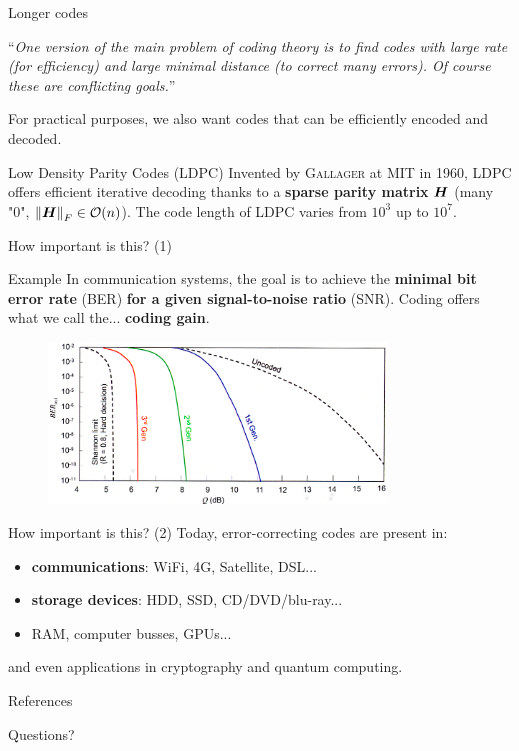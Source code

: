\documentclass[10pt]{beamer}
\begin{document}
\begin{frame}{Longer codes}
    \begin{center}
        ``\textit{One version of the main problem of coding theory is to find codes
        with large rate (for efficiency) and large minimal distance (to correct
        many errors). Of course these are conflicting goals.}''
        \cite{macwilliams}
    \end{center}

    For practical purposes, we also want codes that can be efficiently encoded and decoded.

    \begin{exampleblock}{Low Density Parity Codes (LDPC)}
        Invented by \textsc{Gallager} at MIT in 1960, LDPC offers efficient iterative decoding
        thanks to a \textbf{sparse parity matrix} $\boldsymbol{H}$
        (many "0", $\left\lVert\boldsymbol{H}\right\rVert_F \in \mathcal{O}(n)$).
        The code length of LDPC varies from $10^3$ up to $10^7$.
    \end{exampleblock}
\end{frame}

\begin{frame}{How important is this? (1)}
    \begin{exampleblock}{Example}
        In communication systems, the goal is to achieve the \textbf{minimal bit error rate}
        (BER) \textbf{for a given signal-to-noise ratio} (SNR). Coding offers what we call the...
        \textbf{coding gain}.
        \begin{figure}[ht]
            \centering
            \includegraphics[width=0.8\textwidth]{img/example-com.png}
        \end{figure}
    \end{exampleblock}
\end{frame}

\begin{frame}{How important is this? (2)}
    Today, error-correcting codes are present in:
    \begin{itemize}
        \item \textbf{communications}: WiFi, 4G, Satellite, DSL...
        \item \textbf{storage devices}: HDD, SSD, CD/DVD/blu-ray...
        \item RAM, computer busses, GPUs...
    \end{itemize}
    and even applications in cryptography and quantum computing.
\end{frame}

\begin{frame}{References}
    \nocite{*}
    
    
\end{frame}

\begin{frame}[standout]
    Questions?
\end{frame}
\end{document}
